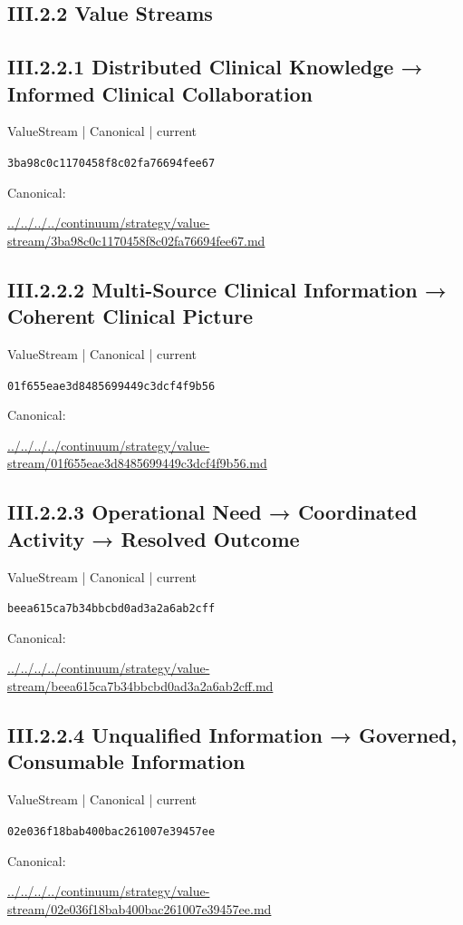 \documentclass[10pt,a4paper]{article}
\begin{document}
\subsection*{III.2.2 Value Streams}
\subsection*{III.2.2.1 Distributed Clinical Knowledge → Informed Clinical Collaboration}
\label{element-3ba98c0c1170458f8c02fa76694fee67}
{\small ValueStream | Canonical | current}\par
\texttt{3ba98c0c1170458f8c02fa76694fee67}\par
Canonical: \par
{\footnotesize\url{../../../../continuum/strategy/value-stream/3ba98c0c1170458f8c02fa76694fee67.md}}\par
\subsection*{III.2.2.2 Multi-Source Clinical Information → Coherent Clinical Picture}
\label{element-01f655eae3d8485699449c3dcf4f9b56}
{\small ValueStream | Canonical | current}\par
\texttt{01f655eae3d8485699449c3dcf4f9b56}\par
Canonical: \par
{\footnotesize\url{../../../../continuum/strategy/value-stream/01f655eae3d8485699449c3dcf4f9b56.md}}\par
\subsection*{III.2.2.3 Operational Need → Coordinated Activity → Resolved Outcome}
\label{element-beea615ca7b34bbcbd0ad3a2a6ab2cff}
{\small ValueStream | Canonical | current}\par
\texttt{beea615ca7b34bbcbd0ad3a2a6ab2cff}\par
Canonical: \par
{\footnotesize\url{../../../../continuum/strategy/value-stream/beea615ca7b34bbcbd0ad3a2a6ab2cff.md}}\par
\subsection*{III.2.2.4 Unqualified Information → Governed, Consumable Information}
\label{element-02e036f18bab400bac261007e39457ee}
{\small ValueStream | Canonical | current}\par
\texttt{02e036f18bab400bac261007e39457ee}\par
Canonical: \par
{\footnotesize\url{../../../../continuum/strategy/value-stream/02e036f18bab400bac261007e39457ee.md}}\par
\end{document}
